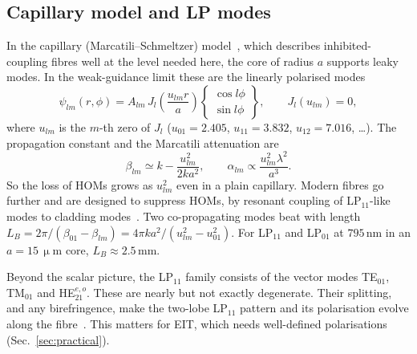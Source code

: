 \documentclass[11pt,a4paper]{article}
\newcommand{\micrometre}{\upmu m}\newcommand{\microkelvin}{\upmu K}
\newcommand{\SI}[2]{\ensuremath{#1\,\mathrm{#2}}}
\begin{document}
\subsection{Capillary model and LP modes}
In the capillary (Marcatili--Schmeltzer) model~\cite{marcatili1964}, which describes inhibited-coupling fibres well at the level needed here, the core of radius $a$ supports leaky modes. In the weak-guidance limit these are the linearly polarised modes~\cite{snyder1983}
\begin{equation}
  \psi_{lm}(r,\phi)=A_{lm}\,J_l\!\left(\frac{u_{lm}r}{a}\right)
  \begin{Bmatrix}\cos l\phi\\ \sin l\phi\end{Bmatrix},\qquad J_{l}(u_{lm})=0,
  \label{eq:LP}
\end{equation}
where $u_{lm}$ is the $m$-th zero of $J_{l}$ ($u_{01}=2.405$, $u_{11}=3.832$, $u_{12}=7.016$, \dots). The propagation constant and the Marcatili attenuation are
\begin{equation}
  \beta_{lm}\simeq k-\frac{u_{lm}^2}{2ka^2},\qquad
  \alpha_{lm}\propto\frac{u_{lm}^2\lambda^2}{a^3}.
  \label{eq:beta}
\end{equation}
So the loss of HOMs grows as $u_{lm}^2$ even in a plain capillary. Modern fibres go further and are designed to suppress HOMs, by resonant coupling of LP$_{11}$-like modes to cladding modes~\cite{uebel2016,poletti2014}. Two co-propagating modes beat with length $L_B=2\pi/(\beta_{01}-\beta_{lm})=4\pi ka^2/(u_{lm}^2-u_{01}^2)$. For LP$_{11}$ and LP$_{01}$ at \SI{795}{nm} in an $a=\SI{15}{\micrometre}$ core, $L_B\approx\SI{2.5}{mm}$.

Beyond the scalar picture, the LP$_{11}$ family consists of the vector modes TE$_{01}$, TM$_{01}$ and HE$_{21}^{e,o}$. These are nearly but not exactly degenerate. Their splitting, and any birefringence, make the two-lobe LP$_{11}$ pattern and its polarisation evolve along the fibre~\cite{snyder1983,ramachandran2013}. This matters for EIT, which needs well-defined polarisations (Sec.~\ref{sec:practical}).
\end{document}
